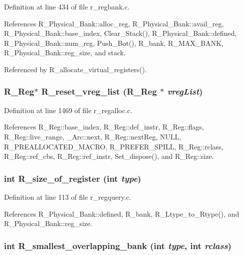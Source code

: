 Definition at line 434 of file r\_\-regbank.c.

References R\_\-Physical\_\-Bank::alloc\_\-reg, R\_\-Physical\_\-Bank::avail\_\-reg, R\_\-Physical\_\-Bank::base\_\-index, Clear\_\-Stack(), R\_\-Physical\_\-Bank::defined, R\_\-Physical\_\-Bank::num\_\-reg, Push\_\-Bot(), R\_\-bank, R\_\-MAX\_\-BANK, R\_\-Physical\_\-Bank::reg\_\-size, and stack.

Referenced by R\_\-allocate\_\-virtual\_\-registers().
\subsubsection{\setlength{\rightskip}{0pt plus 5cm}\bf{R\_\-Reg}$\ast$ R\_\-reset\_\-vreg\_\-list (\bf{R\_\-Reg} $\ast$ {\em vreg\-List})}\label{r__regproto_8h_11406665bb3680ed70a386f69422f60e}




Definition at line 1469 of file r\_\-regalloc.c.

References R\_\-Reg::base\_\-index, R\_\-Reg::def\_\-instr, R\_\-Reg::flags, R\_\-Reg::live\_\-range, \_\-Arc::next, R\_\-Reg::next\-Reg, NULL, R\_\-PREALLOCATED\_\-MACRO, R\_\-PREFER\_\-SPILL, R\_\-Reg::rclass, R\_\-Reg::ref\_\-cbs, R\_\-Reg::ref\_\-instr, Set\_\-dispose(), and R\_\-Reg::size.
\subsubsection{\setlength{\rightskip}{0pt plus 5cm}int R\_\-size\_\-of\_\-register (int {\em type})}\label{r__regproto_8h_b2aac7e5b0f1244101fb93a72ea947e5}




Definition at line 113 of file r\_\-regquery.c.

References R\_\-Physical\_\-Bank::defined, R\_\-bank, R\_\-Ltype\_\-to\_\-Rtype(), and R\_\-Physical\_\-Bank::reg\_\-size.
\subsubsection{\setlength{\rightskip}{0pt plus 5cm}int R\_\-smallest\_\-overlapping\_\-bank (int {\em type}, int {\em rclass})}\label{r__regproto_8h_d2992e99e47a9f04a944495a1d6c3853}




